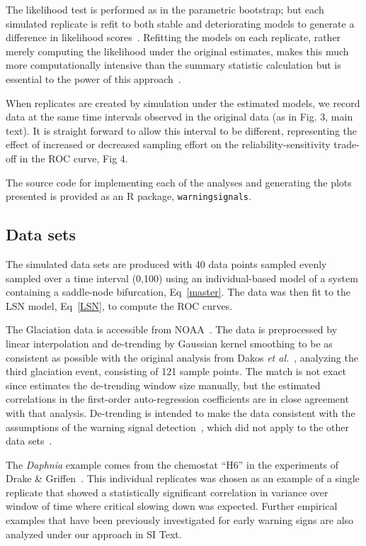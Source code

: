 \documentclass{pnastwo}
\begin{document}
\begin{article}
\begin{materials}
The likelihood test is performed as in the parametric bootstrap; 
but each simulated replicate is refit to both stable and deteriorating models to generate a difference in likelihood scores~\cite{Cox1961}.
Refitting the models on each replicate, 
rather merely computing the likelihood under the original estimates,
makes this much more computationally intensive than the summary statistic calculation but is essential to the power of this approach~\cite{Huelsenbeck1996}.

When replicates are created by simulation under the estimated models,
we record data at the same time intervals observed in the original data (as in Fig. 3, main text). 
It is straight forward to allow this interval to be different,
representing the effect of increased or decreased sampling effort on the reliability-sensitivity trade-off in the ROC curve, Fig 4.

The source code for implementing each of the analyses and generating the plots presented is provided as an R package, \verb|warningsignals|. 


                               \subsection{Data sets}
The simulated data sets are produced with 40 data points
sampled evenly sampled over a time interval (0,100) using an individual-based model of a system containing a saddle-node bifurcation, Eq~\eqref{master}.
The data was then fit to the LSN model, Eq~\eqref{LSN}, to compute the ROC curves. 

The Glaciation data is accessible from NOAA~\cite{Petit1999}.
The data is preprocessed by linear interpolation and de-trending by Gaussian kernel smoothing 
to be as consistent as possible with the original analysis from Dakos \emph{et al.}~\cite{Dakos2008},
analyzing the third glaciation event, consisting of 121 sample points. 
The match is not exact since estimates the de-trending window size manually,
but the estimated correlations in the first-order auto-regression coefficients are in close agreement with that analysis. 
De-trending is intended to make the data consistent with the assumptions of the warning signal detection~\cite{Dakos2008}, 
which did not apply to the other data sets~\cite{Drake2010}.  

The \emph{Daphnia} example comes from the chemostat ``H6'' in the experiments of Drake \& Griffen~\cite{Drake2010}. 
This individual replicates was chosen as an example of a single replicate 
that showed a statistically significant correlation in variance over window of time where critical slowing down was expected. 
Further empirical examples that have been previously investigated for early warning signs are also analyzed under our approach in SI Text.  


\end{materials}
\end{article}
\end{document}
